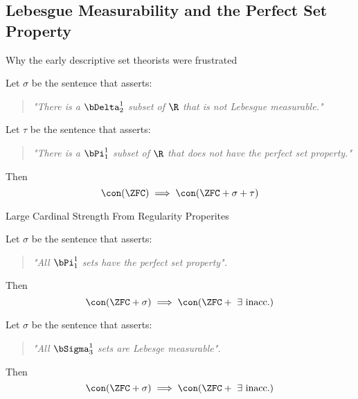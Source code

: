 \documentclass{beamer}
\begin{document}
\subsection{Lebesgue Measurability and the Perfect Set Property}

\begin{frame}{Why the early descriptive set theorists were frustrated}
\begin{theorem}[G\"{o}del, 1938]

Let $\sigma$ be the sentence that asserts:
\begin{quotation}
\emph{"There is a $\bDelta^1_2$ subset
of $\R$ that is not Lebesgue measurable."}
\end{quotation}

Let $\tau$ be the sentence that asserts:
\begin{quotation}
\emph{"There is a $\bPi^1_1$ subset of $\R$ that does not
have the perfect set property."}
\end{quotation}

\pause

Then
$$\con(\ZFC) \implies \con(\ZFC + \sigma + \tau)$$
\end{theorem}
\end{frame}

\begin{frame}{Large Cardinal Strength From Regularity Properites}
\begin{theorem}[Solovay, 1969]
Let $\sigma$ be the sentence that asserts:
\begin{quotation}
\emph{"All $\bPi^1_1$ sets have the perfect set property". }
\end{quotation}

\pause

Then
$$  \con(\ZFC + \sigma) \implies \con(\ZFC + \text{ } \exists \text{ inacc.})$$
\end{theorem}

\pause

\begin{theorem}[Shelah, 1984]
Let $\sigma$ be the sentence that asserts:
\begin{quotation}
\emph{"All $\bSigma^1_3$ sets are Lebesge measurable". }
\end{quotation}

\pause

Then
$$  \con(\ZFC + \sigma) \implies \con(\ZFC + \text{ } \exists \text{ inacc.})$$
\end{theorem}

\end{frame}
\end{document}

